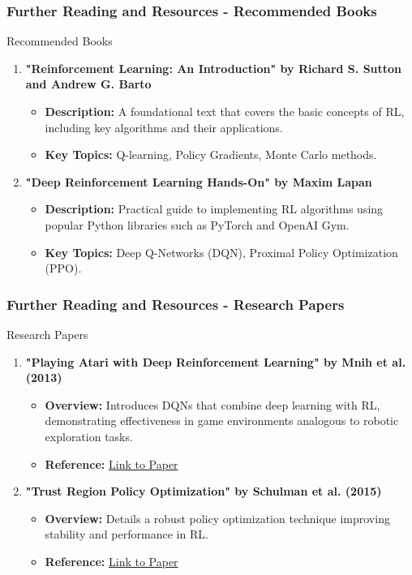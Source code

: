 \documentclass[aspectratio=169]{beamer}
\begin{document}
\begin{frame}[fragile]
  \frametitle{Further Reading and Resources - Recommended Books}
  \begin{block}{Recommended Books}
    \begin{enumerate}
      \item \textbf{"Reinforcement Learning: An Introduction" by Richard S. Sutton and Andrew G. Barto}
          \begin{itemize}
              \item \textbf{Description:} A foundational text that covers the basic concepts of RL, including key algorithms and their applications.
              \item \textbf{Key Topics:} Q-learning, Policy Gradients, Monte Carlo methods.
          \end{itemize}
    
      \item \textbf{"Deep Reinforcement Learning Hands-On" by Maxim Lapan}
          \begin{itemize}
              \item \textbf{Description:} Practical guide to implementing RL algorithms using popular Python libraries such as PyTorch and OpenAI Gym.
              \item \textbf{Key Topics:} Deep Q-Networks (DQN), Proximal Policy Optimization (PPO).
          \end{itemize}
    \end{enumerate}
  \end{block}
\end{frame}

\begin{frame}[fragile]
  \frametitle{Further Reading and Resources - Research Papers}
  \begin{block}{Research Papers}
    \begin{enumerate}
      \item \textbf{"Playing Atari with Deep Reinforcement Learning" by Mnih et al. (2013)}
          \begin{itemize}
              \item \textbf{Overview:} Introduces DQNs that combine deep learning with RL, demonstrating effectiveness in game environments analogous to robotic exploration tasks.
              \item \textbf{Reference:} \href{https://arxiv.org/abs/1312.5602}{Link to Paper}
          \end{itemize}

      \item \textbf{"Trust Region Policy Optimization" by Schulman et al. (2015)}
          \begin{itemize}
              \item \textbf{Overview:} Details a robust policy optimization technique improving stability and performance in RL.
              \item \textbf{Reference:} \href{https://arxiv.org/abs/1502.05477}{Link to Paper}
          \end{itemize}
    \end{enumerate}
  \end{block}
\end{frame}
\end{document}
